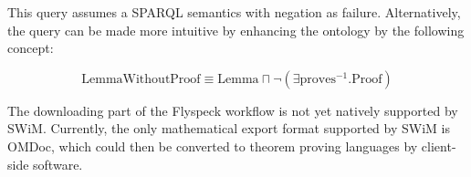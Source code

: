 This query assumes a SPARQL semantics with negation as failure\cite{Polleres:SPARQL-Rules07}.  Alternatively, the query
can be made more intuitive by enhancing the ontology by the following concept:

\[
\mbox{LemmaWithoutProof}\equiv\mbox{Lemma}\sqcap\neg(\exists\mbox{proves}^{-1}.\mbox{Proof})
\]

The downloading part of the Flyspeck workflow is not yet natively supported by SWiM.
Currently, the only mathematical export format supported by SWiM is OMDoc, which could
then be converted to theorem proving languages by client-side software\cite[chap.\
25.2]{Kohlhase:omdoc1.2}.


